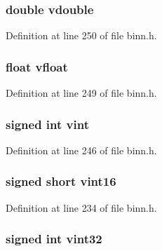 \subsubsection[{\texorpdfstring{vdouble}{vdouble}}]{\setlength{\rightskip}{0pt plus 5cm}double vdouble}\hypertarget{structbinn__struct_abbc2c95513d59c2d8b82bda74208d447}{}\label{structbinn__struct_abbc2c95513d59c2d8b82bda74208d447}


Definition at line 250 of file binn.\+h.

\subsubsection[{\texorpdfstring{vfloat}{vfloat}}]{\setlength{\rightskip}{0pt plus 5cm}float vfloat}\hypertarget{structbinn__struct_a70f320b1421f6d340ca87e382516337d}{}\label{structbinn__struct_a70f320b1421f6d340ca87e382516337d}


Definition at line 249 of file binn.\+h.

\subsubsection[{\texorpdfstring{vint}{vint}}]{\setlength{\rightskip}{0pt plus 5cm}signed int vint}\hypertarget{structbinn__struct_afdc7f4a00956c690bfe04ac581c54446}{}\label{structbinn__struct_afdc7f4a00956c690bfe04ac581c54446}


Definition at line 246 of file binn.\+h.

\subsubsection[{\texorpdfstring{vint16}{vint16}}]{\setlength{\rightskip}{0pt plus 5cm}signed short vint16}\hypertarget{structbinn__struct_a5425c19a3a87dfa922ae09e967306c92}{}\label{structbinn__struct_a5425c19a3a87dfa922ae09e967306c92}


Definition at line 234 of file binn.\+h.

\subsubsection[{\texorpdfstring{vint32}{vint32}}]{\setlength{\rightskip}{0pt plus 5cm}signed int vint32}\hypertarget{structbinn__struct_ae6f05ec4a6bd6b3bbfacd86c8f9d7618}{}\label{structbinn__struct_ae6f05ec4a6bd6b3bbfacd86c8f9d7618}



